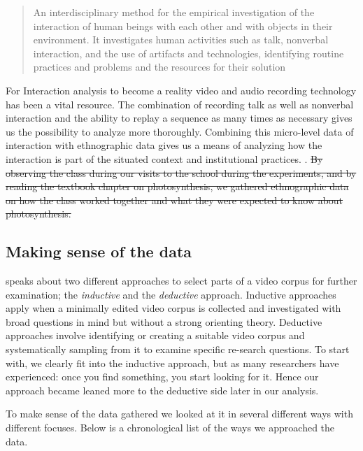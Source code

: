 \begin{quote}
An interdisciplinary method for the empirical investigation of the interaction of human
beings with each other and with objects in their environment. It investigates human
activities such as talk, nonverbal interaction, and the use of artifacts and technologies,
identifying routine practices and problems and the resources for their solution \citep[p39]{jordan1995interaction}
\end{quote}

For Interaction analysis to become a reality video and audio recording technology has been a vital resource. The combination of recording talk as well as nonverbal interaction and the ability to replay a sequence as many times as necessary gives us the possibility to analyze more thoroughly. Combining this micro-level data of interaction with ethnographic data gives us a means of analyzing how the interaction is part of the situated context and institutional practices. \citep{furberg2009scientific}. \sout{ By observing the class during our visits to the school during the experiments, and by reading the textbook chapter on photosynthesis, we gathered ethnographic data on how the class worked together and what they were expected to know about photosynthesis. }


\subsection{Making sense of the data}
\citet{derry2010conducting} speaks about two different approaches to select parts of a video corpus for further examination; the \emph{inductive} and the \emph{deductive} approach. Inductive approaches apply when a minimally edited video corpus is collected and investigated with broad questions in mind but without a strong orienting theory. Deductive approaches involve identifying or creating a suitable video corpus and systematically sampling from it to examine specific re-search questions. \citep{derry2010conducting} To start with, we clearly fit into the inductive approach, but as many researchers have experienced: once you find something, you start looking for it. Hence our approach became leaned more to the deductive side later in our analysis.


To make sense of the data gathered we looked at it in several different ways with different focuses. Below is a chronological list of the ways we approached the data. 


